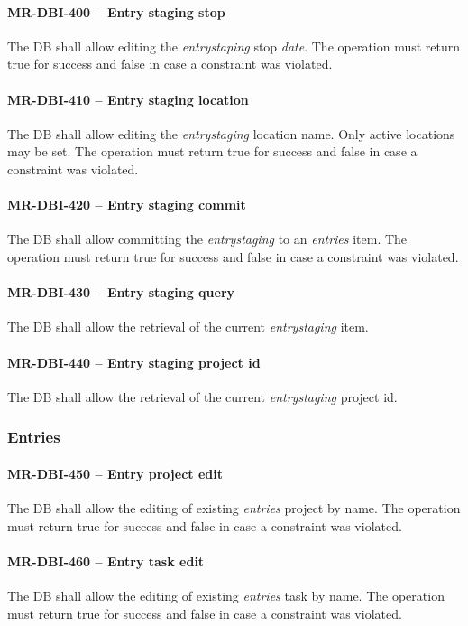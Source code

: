 \paragraph{MR-DBI-400 -- Entry staging stop}
The \gls{DB} shall allow editing the \emph{entrystaping} stop \emph{date}.
The operation must return true for success and false in case a
constraint was violated.

\paragraph{MR-DBI-410 -- Entry staging location}
The \gls{DB} shall allow editing the \emph{entrystaging} location name.
Only active locations may be set.
The operation must return true for success and false in case a
constraint was violated.

\paragraph{MR-DBI-420 -- Entry staging commit}
The \gls{DB} shall allow committing the \emph{entrystaging} to an
\emph{entries} item.
The operation must return true for success and false in case a
constraint was violated.

\paragraph{MR-DBI-430 -- Entry staging query}
The \gls{DB} shall allow the retrieval of the current \emph{entrystaging} item.

\paragraph{MR-DBI-440 -- Entry staging project id}
The \gls{DB} shall allow the retrieval of the current \emph{entrystaging}
project id.

\subsubsection{Entries}
\paragraph{MR-DBI-450 -- Entry project edit}
The \gls{DB} shall allow the editing of existing \emph{entries} project
by name.
The operation must return true for success and false in case a
constraint was violated.

\paragraph{MR-DBI-460 -- Entry task edit}
The \gls{DB} shall allow the editing of existing \emph{entries} task
by name.
The operation must return true for success and false in case a
constraint was violated.

